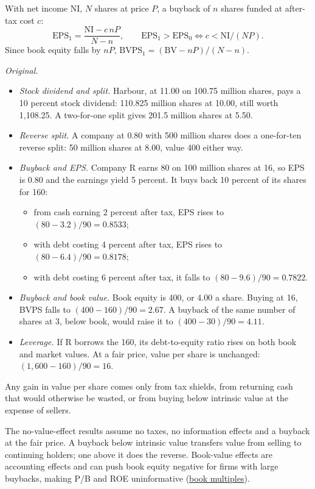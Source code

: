 \begin{qfmethod}
 With net income $\mathrm{NI}$, $N$ shares at price $P$, a buyback of $n$ shares funded at after-tax cost $c$:
\[ \mathrm{EPS}_1=\frac{\mathrm{NI}-c\,nP}{N-n},\qquad \mathrm{EPS}_1>\mathrm{EPS}_0\iff c<\mathrm{NI}/(NP). \]
Since book equity falls by $nP$, $\mathrm{BVPS}_1=(\mathrm{BV}-nP)/(N-n)$.

 \emph{Original.}
\begin{itemize}
\item \emph{Stock dividend and split.} Harbour, at 11.00 on 100.75 million shares, pays a 10 percent stock dividend: 110.825 million shares at 10.00, still worth 1,108.25. A two-for-one split gives 201.5 million shares at 5.50.
\item \emph{Reverse split.} A company at 0.80 with 500 million shares does a one-for-ten reverse split: 50 million shares at 8.00, value 400 either way.
\item \emph{Buyback and EPS.} Company R earns 80 on 100 million shares at 16, so EPS is 0.80 and the earnings yield 5 percent. It buys back 10 percent of its shares for 160:
\begin{itemize}
\item from cash earning 2 percent after tax, EPS rises to $(80-3.2)/90=0.8533$;
\item with debt costing 4 percent after tax, EPS rises to $(80-6.4)/90=0.8178$;
\item with debt costing 6 percent after tax, it falls to $(80-9.6)/90=0.7822$.
\end{itemize}
\item \emph{Buyback and book value.} Book equity is 400, or 4.00 a share. Buying at 16, BVPS falls to $(400-160)/90=2.67$. A buyback of the same number of shares at 3, below book, would raise it to $(400-30)/90=4.11$.
\item \emph{Leverage.} If R borrows the 160, its debt-to-equity ratio rises on both book and market values. At a fair price, value per share is unchanged: $(1{,}600-160)/90=16$.
\end{itemize}
Any gain in value per share comes only from tax shields, from returning cash that would otherwise be wasted, or from buying below intrinsic value at the expense of sellers.

 The no-value-effect results assume no taxes, no information effects and a buyback at the fair price. A buyback below intrinsic value transfers value from selling to continuing holders; one above it does the reverse. Book-value effects are accounting effects and can push book equity negative for firms with large buybacks, making P/B and ROE uninformative (\hyperref[meth:alternative-multiples]{book multiples}).


\end{qfmethod}
